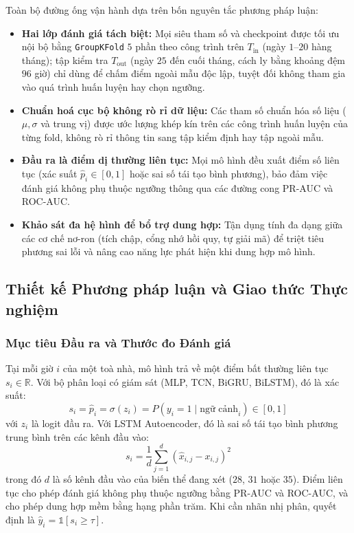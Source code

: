 Toàn bộ đường ống vận hành dựa trên bốn nguyên tắc phương pháp luận:
\begin{itemize}
    \item \textbf{Hai lớp đánh giá tách biệt:} Mọi siêu tham số và checkpoint được tối ưu nội bộ bằng \texttt{GroupKFold} $5$ phần theo công trình trên $T_{\text{in}}$ (ngày $1$--$20$ hàng tháng); tập kiểm tra $T_{\text{out}}$ (ngày $25$ đến cuối tháng, cách ly bằng khoảng đệm $96$ giờ) chỉ dùng để chấm điểm ngoài mẫu độc lập, tuyệt đối không tham gia vào quá trình huấn luyện hay chọn ngưỡng.
    \item \textbf{Chuẩn hoá cục bộ không rò rỉ dữ liệu:} Các tham số chuẩn hóa số liệu ($\mu, \sigma$ và trung vị) được ước lượng khép kín trên các công trình huấn luyện của từng fold, không rò rỉ thông tin sang tập kiểm định hay tập ngoài mẫu.
    \item \textbf{Đầu ra là điểm dị thường liên tục:} Mọi mô hình đều xuất điểm số liên tục (xác suất $\hat{p}_i \in [0, 1]$ hoặc sai số tái tạo bình phương), bảo đảm việc đánh giá không phụ thuộc ngưỡng thông qua các đường cong PR-AUC và ROC-AUC.
    \item \textbf{Khảo sát đa hệ hình để bổ trợ dung hợp:} Tận dụng tính đa dạng giữa các cơ chế nơ-ron (tích chập, cổng nhớ hồi quy, tự giải mã) để triệt tiêu phương sai lỗi và nâng cao năng lực phát hiện khi dung hợp mô hình.
\end{itemize}

\subsection{Thiết kế Phương pháp luận và Giao thức Thực nghiệm}

\subsubsection{Mục tiêu Đầu ra và Thước đo Đánh giá}

Tại mỗi giờ $i$ của một toà nhà, mô hình trả về một điểm bất thường liên tục $s_i \in \mathbb{R}$. Với bộ phân loại có giám sát (MLP, TCN, BiGRU, BiLSTM), đó là xác suất:
\begin{equation*}
    s_i = \hat{p}_i = \sigma(z_i) = P(y_i = 1 \mid \text{ngữ cảnh}_i) \in [0, 1]
\end{equation*}
với $z_i$ là logit đầu ra. Với LSTM Autoencoder, đó là sai số tái tạo bình phương trung bình trên các kênh đầu vào:
\begin{equation*}
    s_i = \frac{1}{d} \sum_{j=1}^{d} \left( \hat{x}_{i,j} - x_{i,j} \right)^2
\end{equation*}
trong đó $d$ là số kênh đầu vào của biến thể đang xét ($28$, $31$ hoặc $35$). Điểm liên tục cho phép đánh giá không phụ thuộc ngưỡng bằng PR-AUC và ROC-AUC, và cho phép dung hợp mềm bằng hạng phần trăm. Khi cần nhãn nhị phân, quyết định là $\hat{y}_i = \mathbb{1}[s_i \geq \tau]$.

